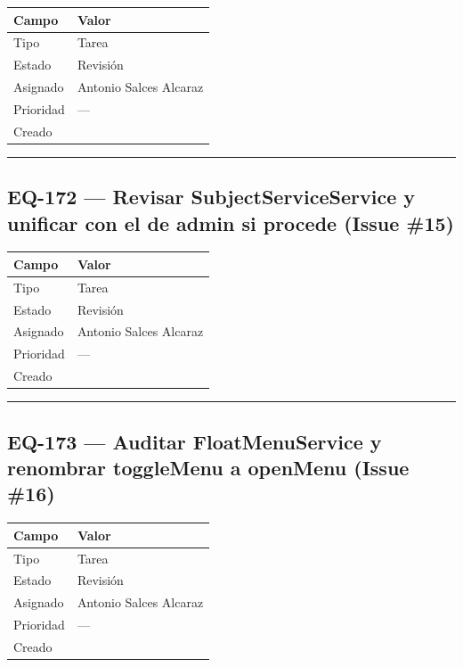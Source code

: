 \documentclass[
  spanish,
  11pt,
]{report}
\newcounter{none} %
\begin{document}
{\def\LTcaptype{none} %
\begin{longtable}[]{@{}ll@{}}
\toprule\noalign{}
Campo & Valor \\
\midrule\noalign{}
\endhead
\bottomrule\noalign{}
\endlastfoot
Tipo & Tarea \\
Estado & Revisión \\
Asignado & Antonio Salces Alcaraz \\
Prioridad & --- \\
Creado & \\
\end{longtable}
}

\begin{center}\rule{0.5\linewidth}{0.5pt}\end{center}

\subsection{EQ-172 --- Revisar SubjectServiceService y unificar con el
de admin si procede (Issue
\#15)}\label{eq-172-revisar-subjectserviceservice-y-unificar-con-el-de-admin-si-procede-issue-15}

{\def\LTcaptype{none} %
\begin{longtable}[]{@{}ll@{}}
\toprule\noalign{}
Campo & Valor \\
\midrule\noalign{}
\endhead
\bottomrule\noalign{}
\endlastfoot
Tipo & Tarea \\
Estado & Revisión \\
Asignado & Antonio Salces Alcaraz \\
Prioridad & --- \\
Creado & \\
\end{longtable}
}

\begin{center}\rule{0.5\linewidth}{0.5pt}\end{center}

\subsection{EQ-173 --- Auditar FloatMenuService y renombrar toggleMenu a
openMenu (Issue
\#16)}\label{eq-173-auditar-floatmenuservice-y-renombrar-togglemenu-a-openmenu-issue-16}

{\def\LTcaptype{none} %
\begin{longtable}[]{@{}ll@{}}
\toprule\noalign{}
Campo & Valor \\
\midrule\noalign{}
\endhead
\bottomrule\noalign{}
\endlastfoot
Tipo & Tarea \\
Estado & Revisión \\
Asignado & Antonio Salces Alcaraz \\
Prioridad & --- \\
Creado & \\
\end{longtable}
}
\end{document}
